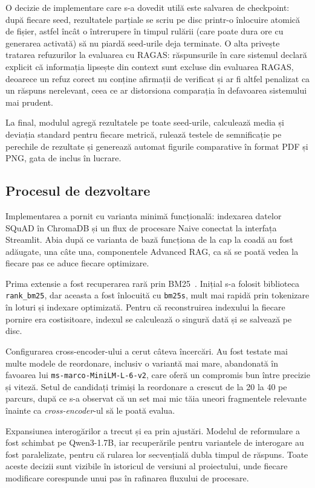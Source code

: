 O decizie de implementare care s-a dovedit utilă este salvarea de checkpoint: după fiecare seed, rezultatele parțiale se scriu pe disc printr-o înlocuire atomică de fișier, astfel încât o întrerupere în timpul rulării (care poate dura ore cu generarea activată) să nu piardă seed-urile deja terminate. O alta privește tratarea refuzurilor la evaluarea cu RAGAS: răspunsurile în care sistemul declară explicit că informația lipsește din context sunt excluse din evaluarea RAGAS, deoarece un refuz corect nu conține afirmații de verificat și ar fi altfel penalizat ca un răspuns nerelevant, ceea ce ar distorsiona comparația în defavoarea sistemului mai prudent.

La final, modulul agregă rezultatele pe toate seed-urile, calculează media și deviația standard pentru fiecare metrică, rulează testele de semnificație pe perechile de rezultate și generează automat figurile comparative în format PDF și PNG, gata de inclus în lucrare.

\subsection{Procesul de dezvoltare}

Implementarea a pornit cu varianta minimă funcțională: indexarea datelor SQuAD în ChromaDB și un flux de procesare Naive conectat la interfața Streamlit. Abia după ce varianta de bază funcționa de la cap la coadă au fost adăugate, una câte una, componentele Advanced RAG, ca să se poată vedea la fiecare pas ce aduce fiecare optimizare.

Prima extensie a fost recuperarea rară prin BM25~\cite{robertson2009bm25}. Inițial s-a folosit biblioteca \texttt{rank\_bm25}, dar aceasta a fost înlocuită cu \texttt{bm25s}, mult mai rapidă prin tokenizare în loturi și indexare optimizată. Pentru că reconstruirea indexului la fiecare pornire era costisitoare, indexul se calculează o singură dată și se salvează pe disc.

Configurarea cross-encoder-ului a cerut câteva încercări. Au fost testate mai multe modele de reordonare, inclusiv o variantă mai mare, abandonată în favoarea lui \texttt{ms-marco-MiniLM-L-6-v2}, care oferă un compromis bun între precizie și viteză. Setul de candidați trimiși la reordonare a crescut de la 20 la 40 pe parcurs, după ce s-a observat că un set mai mic tăia uneori fragmentele relevante înainte ca \textit{cross-encoder}-ul să le poată evalua.

Expansiunea interogărilor a trecut și ea prin ajustări. Modelul de reformulare a fost schimbat pe Qwen3-1.7B, iar recuperările pentru variantele de interogare au fost paralelizate, pentru că rularea lor secvențială dubla timpul de răspuns. Toate aceste decizii sunt vizibile în istoricul de versiuni al proiectului, unde fiecare modificare corespunde unui pas în rafinarea fluxului de procesare.

